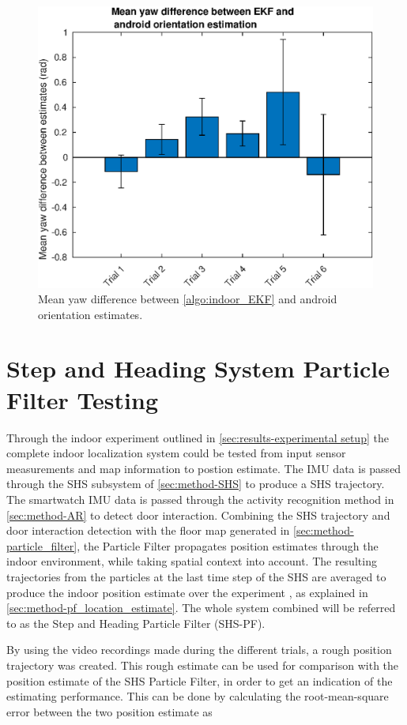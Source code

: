 \begin{figure}[H]
	\centering
	\includegraphics[width=0.7\linewidth]{images/20201128_1646_mean_yaw_difference_1}
	\setlength{\belowcaptionskip}{-20pt}
	\caption{Mean yaw difference between \cref{algo:indoor_EKF} and android orientation estimates.}
	\label{fig:yaw_difference_between_android_and_ekf_1}
\end{figure}

\newpage
\section{Step and Heading System Particle Filter Testing}

Through the indoor experiment outlined in \cref{sec:results-experimental setup} the complete indoor localization system could be tested from input sensor measurements and map information to postion estimate. The IMU data is passed through the \ac{SHS} subsystem of \cref{sec:method-SHS} to produce a \ac{SHS} trajectory. The smartwatch IMU data is passed through the activity recognition method in \cref{sec:method-AR} to  detect door interaction. Combining the \ac{SHS} trajectory and door interaction detection with the floor map generated in \cref{sec:method-particle_filter}, the Particle Filter propagates position estimates through the indoor environment, while taking spatial context into account. The resulting trajectories from the particles at the last time step of the SHS are averaged to produce the indoor position estimate over the experiment , as explained in \cref{sec:method-pf_location_estimate}. The whole system combined will be referred to as the Step and Heading Particle Filter (SHS-PF).  \par 

By using the video recordings made during the different trials, a rough position trajectory was created. This rough estimate can be used for comparison with the position estimate of the \ac{SHS} Particle Filter, in order to get an indication of the estimating performance. This can be done by calculating the root-mean-square error between the two position estimate as

